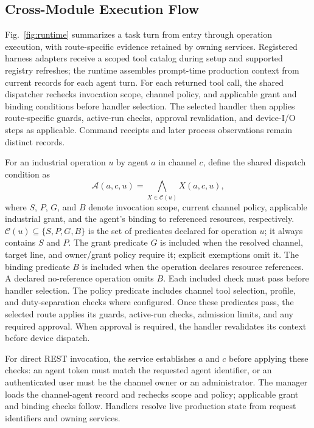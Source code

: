 \subsection{Cross-Module Execution Flow}
\label{sec:executionflow}
Fig.~\ref{fig:runtime} summarizes a task turn from entry through operation
execution, with route-specific evidence retained by owning services. Registered
harness adapters receive a scoped tool catalog during setup and supported
registry refreshes; the runtime assembles prompt-time production context from
current records for each agent turn. For each returned tool call, the shared
dispatcher rechecks invocation scope, channel policy, and applicable grant and
binding conditions before handler selection. The selected handler
then applies route-specific guards, active-run checks, approval
revalidation, and device-I/O steps as applicable. Command receipts and later
process observations remain distinct records.

For an industrial operation $u$ by agent $a$ in channel $c$, define the
shared dispatch condition as
\begin{equation}
\mathcal{A}(a,c,u)=\bigwedge_{X\in\mathcal{C}(u)}X(a,c,u),
\label{eq:dispatch-contract}
\end{equation}
where $S$, $P$, $G$, and $B$ denote invocation scope, current channel policy,
applicable industrial grant, and the agent's binding to referenced resources,
respectively. $\mathcal{C}(u)\subseteq\{S,P,G,B\}$ is the set of predicates
declared for operation $u$; it always contains $S$ and $P$. The grant predicate
$G$ is included when the resolved channel, target line, and owner/grant policy
require it; explicit exemptions omit it. The binding predicate $B$ is included
when the operation declares resource references. A declared no-reference
operation omits $B$. Each included check must pass before
handler selection. The policy predicate includes channel tool selection,
profile, and duty-separation checks where configured. Once these predicates
pass, the selected route applies its guards, active-run checks, admission
limits, and any required approval. When approval is required, the handler
revalidates its context before device dispatch.

For direct REST invocation, the service establishes $a$ and $c$ before applying
these checks: an agent token must match the requested agent identifier, or an
authenticated user must be the channel owner or an administrator. The manager
loads the channel-agent record and rechecks scope and policy; applicable grant
and binding checks follow. Handlers resolve live
production state from request identifiers and owning services.

